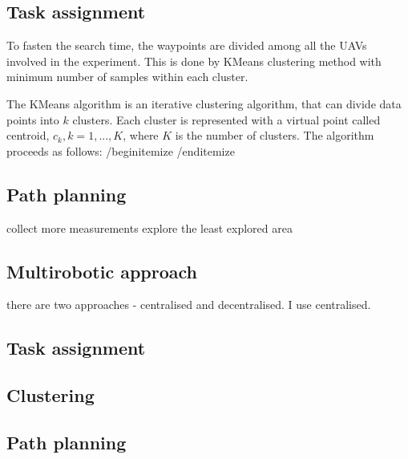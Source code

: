 \subsection{Task assignment}

To fasten the search time, the waypoints are divided among all the \ac{UAV}s involved in the experiment.
This is done by KMeans clustering method with minimum number of samples within each cluster.

The KMeans algorithm is an iterative clustering algorithm, that can divide data points into $k$ clusters.
Each cluster is represented with a virtual point called centroid, $c_{k}, k = 1, ... , K$, where $K$ is the number of clusters.
The algorithm proceeds as follows:
/begin{itemize}
/end{itemize}




\subsection{Path planning}





collect more measurements
explore the least explored area

\subsection{Multirobotic approach}
there are two approaches - centralised and decentralised.
I use centralised.

\subsection{Task assignment}

\subsection{Clustering}
\subsection{Path planning}











